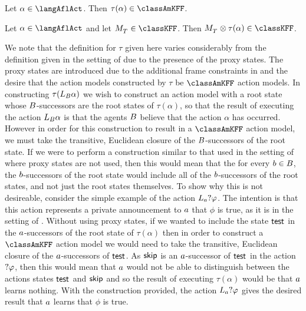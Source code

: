 \begin{lemma}\label{afl-kff-structure}
Let $\alpha \in \langAflAct$. Then $\tau(\alpha) \in \classAmKFF$.
\end{lemma}

\begin{lemma}\label{afl-kff-exec}
Let $\alpha \in \langAflAct$ and let $\kPModel{\kStatesT} \in \classKFF$.
Then $\kPModel{\kStatesT} \exec \tau(\alpha) \in \classKFF$.
\end{lemma}

We note that the definition for $\tau$ given here varies considerably from the definition given in the setting of \classK{} due to the presence of the proxy states.
The proxy states are introduced due to the additional frame constraints in \classKFF{} and the desire that the action models constructed by $\tau$ be $\classAmKFF$ action models.
In constructing $\tau(L_B \alpha)$ we wish to construct an action model with a root state whose $B$-successors are the root states of $\tau(\alpha)$, so that the result of executing the action $L_B \alpha$ is that the agents $B$ believe that the action $\alpha$ has occurred.
However in order for this construction to result in a $\classAmKFF$ action model, we must take the transitive, Euclidean closure of the $B$-successors of the root state.
If we were to perform a construction similar to that used in the setting of \classK{} where proxy states are not used, then this would mean that the for every $b \in B$, the $b$-successors of the root state would include all of the $b$-successors of the root states, and not just the root states themselves.
To show why this is not desireable, consider the simple example of the action $L_a ?{\varphi}$.
The intention is that this action represents a private announcement to $a$ that $\phi$ is true, as it is in the setting of \classK{}.
Without using proxy states, if we wanted to include the state $\aStateTest$ in the $a$-successors of the root state of $\tau(\alpha)$ then in order to construct a $\classAmKFF$ action model we would need to take the transitive, Euclidean closure of the $a$-successors of $\aStateTest$.
As $\aStateSkip$ is an $a$-successor of $\aStateTest$ in the action $?{\varphi}$, then this would mean that $a$ would not be able to distinguish between the actions states $\aStateTest$ and $\aStateSkip$ and so the result of executing $\tau(\alpha)$ would be that $a$ learns nothing.
With the construction provided, the action $L_a ?{\varphi}$ gives the desired result that $a$ learns that $\phi$ is true.


